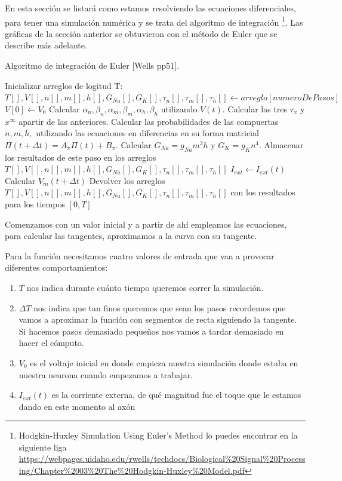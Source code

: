 En esta sección se listará como estamos resolviendo las ecuaciones diferenciales, para tener una simulación numérica y se trata del algoritmo de integración \footnote{Hodgkin-Huxley Simulation Using Euler's Method lo puedes encontrar en la siguiente liga \url{https://webpages.uidaho.edu/rwells/techdocs/Biological\%20Signal\%20Processing/Chapter\%2003\%20The\%20Hodgkin-Huxley\%20Model.pdf}}. Las gráficas de la sección anterior se obtuvieron con el método de Euler que se describe más adelante.

\begin{algorithm}
  \caption{Algoritmo de integración de Euler [Wells pp51].}\label{AIE}
  \begin{algorithmic}[1]
    \State Inicializar arreglos de logitud T: $T[],V[],n[],m[],h[],G_{Na}[],G_{K}[],\tau_{n}[],\tau_{m}[],\tau_{h}[] \gets arreglo[numeroDePasos] $
    \State  $V[0] \gets V_{0}$
        \State Calcular $\alpha_{n}, \beta_{n}, \alpha_{m}, \beta_{m},\alpha_{h}, \beta_{h} $ utilizando $V(t)$.
        \State Calcular las tres $\tau_{x} $ y $x^\infty $ apartir de las anteriores.
        \State Calcular las probabilidades de las compuertas $n, m, h, $ utilizando las ecuaciones en diferencias en su forma matricial $\Pi(t + \Delta t) = A_{\pi}\Pi(t) + B_{\pi}$.
        \State Calcular $G_{Na} = g_{Na}m^3h $ y $G_{K} = g_{K}n^4 $.
        \State Almacenar los resultados de este paso en los arreglos $T[], V[], n[], m[], h[], G_{Na}[], G_{K}[], \tau_{n}[], \tau_{m}[], \tau_{h}[] $
        \State $I_{ext} \gets I_{ext}(t) $
        \State Calcular $V_{m} (t + \Delta t) $
    \EndFor
    \State Devolver los arreglos $T[],V[],n[],m[],h[],G_{Na}[],G_{K}[],\tau_{n}[],\tau_{m}[],\tau_{h}[] $ con los resultados para los tiempos $[0,T] $
    \EndFunction
  \end{algorithmic}
\end{algorithm}


Comenzamos con un valor inicial y a partir de ahí empleamos las ecuaciones, para calcular las tangentes, aproximamos a la curva con su tangente.

Para la función  necesitamos cuatro valores de entrada que van a provocar diferentes comportamientos:

\begin{enumerate}
 \item $T$ nos indica durante cuánto tiempo queremos correr la simulación.
 \item $\Delta T $ nos indica que tan finos queremos que sean los pasos recordemos que vamos a aproximar la función con segmentos de recta siguiendo la tangente. Si hacemos pasos demasiado pequeños nos vamos a tardar demasiado en hacer el cómputo.
 \item $V_{0} $ es el voltaje inicial en donde empieza nuestra simulación donde estaba en nuestra neurona cuando empezamos a trabajar.
 \item $I_{ext}(t) $ es la corriente externa, de qué magnitud fue el toque que le estamos dando en este momento al axón 

\end{enumerate}

